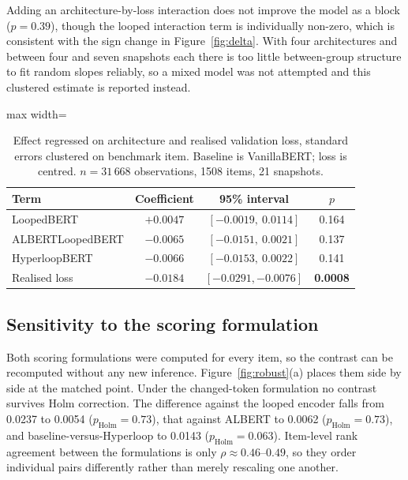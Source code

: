\documentclass[sigconf,natbib=true,anonymous=true]{acmart}
\begin{document}
Adding an architecture-by-loss interaction does not improve the model as a block
($p = 0.39$), though the looped interaction term is individually non-zero, which
is consistent with the sign change in Figure~\ref{fig:delta}. With four
architectures and between four and seven snapshots each there is too little
between-group structure to fit random slopes reliably, so a mixed model was not
attempted and this clustered estimate is reported instead.

\begin{table}[t]
\centering
\caption{Effect regressed on architecture and realised validation loss, standard
errors clustered on benchmark item. Baseline is VanillaBERT; loss is centred.
$n = 31\,668$ observations, 1508 items, 21 snapshots.}
\label{tab:model}
\footnotesize
\begin{adjustbox}{max width=\columnwidth}
\begin{tabular}{lccc}
\toprule
Term & Coefficient & 95\% interval & $p$ \\
\midrule
LoopedBERT        & $+0.0047$ & $[-0.0019,\ 0.0114]$ & 0.164 \\
ALBERTLoopedBERT  & $-0.0065$ & $[-0.0151,\ 0.0021]$ & 0.137 \\
HyperloopBERT     & $-0.0066$ & $[-0.0153,\ 0.0022]$ & 0.141 \\
Realised loss     & $-0.0184$ & $[-0.0291, -0.0076]$ & \textbf{0.0008} \\
\bottomrule
\end{tabular}
\end{adjustbox}
\end{table}

\subsection{Sensitivity to the scoring formulation}
\label{sec:scorer}

Both scoring formulations were computed for every item, so the contrast can be
recomputed without any new inference. Figure~\ref{fig:robust}(a) places them side
by side at the matched point. Under the changed-token formulation no contrast
survives Holm correction. The difference against the looped encoder falls from
0.0237 to 0.0054 ($p_{\text{Holm}} = 0.73$), that against ALBERT to 0.0062
($p_{\text{Holm}} = 0.73$), and baseline-versus-Hyperloop to 0.0143
($p_{\text{Holm}} = 0.063$). Item-level rank agreement between the formulations
is only $\rho \approx 0.46$--$0.49$, so they order individual pairs differently
rather than merely rescaling one another.
\end{document}
